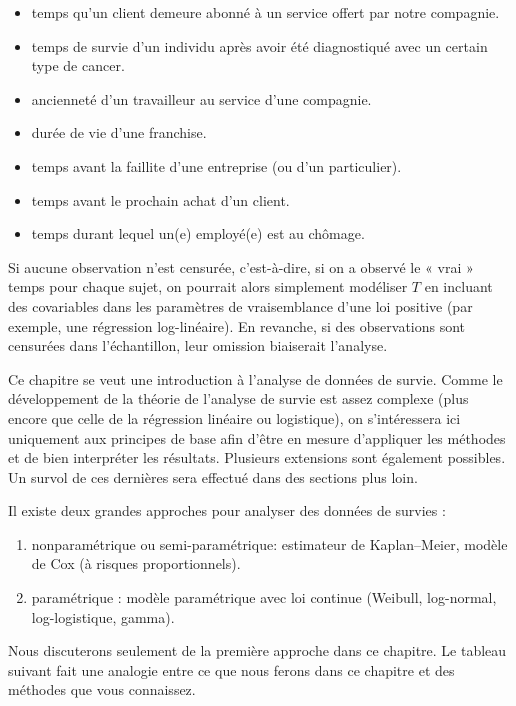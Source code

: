 \documentclass[
  11pt,
  letterpaper,
]{book}
\providecommand{\tightlist}{%
  \setlength{\itemsep}{0pt}\setlength{\parskip}{0pt}}\usepackage{longtable,booktabs,array}
\theoremstyle{definition}
\theoremstyle{remark}
\begin{document}
\begin{itemize}
\tightlist
\item
  temps qu'un client demeure abonné à un service offert par notre
  compagnie.
\item
  temps de survie d'un individu après avoir été diagnostiqué avec un
  certain type de cancer.
\item
  ancienneté d'un travailleur au service d'une compagnie.
\item
  durée de vie d'une franchise.
\item
  temps avant la faillite d'une entreprise (ou d'un particulier).
\item
  temps avant le prochain achat d'un client.
\item
  temps durant lequel un(e) employé(e) est au chômage.
\end{itemize}

Si aucune observation n'est censurée, c'est-à-dire, si on a observé le «
vrai » temps pour chaque sujet, on pourrait alors simplement modéliser
\(T\) en incluant des covariables dans les paramètres de vraisemblance
d'une loi positive (par exemple, une régression log-linéaire). En
revanche, si des observations sont censurées dans l'échantillon, leur
omission biaiserait l'analyse.

Ce chapitre se veut une introduction à l'analyse de données de survie.
Comme le développement de la théorie de l'analyse de survie est assez
complexe (plus encore que celle de la régression linéaire ou
logistique), on s'intéressera ici uniquement aux principes de base afin
d'être en mesure d'appliquer les méthodes et de bien interpréter les
résultats. Plusieurs extensions sont également possibles. Un survol de
ces dernières sera effectué dans des sections plus loin.

Il existe deux grandes approches pour analyser des données de survies :

\begin{enumerate}
\def\labelenumi{\roman{enumi})}
\tightlist
\item
  nonparamétrique ou semi-paramétrique: estimateur de Kaplan--Meier,
  modèle de Cox (à risques proportionnels).
\item
  paramétrique : modèle paramétrique avec loi continue (Weibull,
  log-normal, log-logistique, gamma).
\end{enumerate}

Nous discuterons seulement de la première approche dans ce chapitre. Le
tableau suivant fait une analogie entre ce que nous ferons dans ce
chapitre et des méthodes que vous connaissez.
\end{document}
